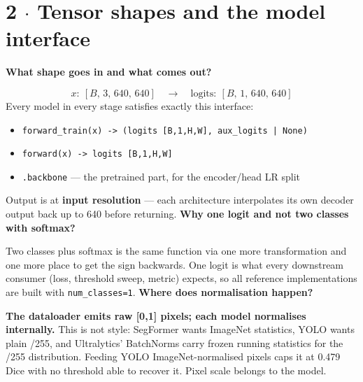 \documentclass[10pt,a4paper]{article}
\newcommand{\qq}[1]{\medskip\noindent\textbf{\color{navy}#1}\par\nobreak}
\begin{document}
\section*{2 $\cdot$ Tensor shapes and the model interface}
\qq{What shape goes in and what comes out?}
\[x:\ [B,\,3,\,640,\,640]\quad\longrightarrow\quad \mathrm{logits}:\ [B,\,1,\,640,\,640]\]
Every model in every stage satisfies exactly this interface:
\begin{itemize}\setlength\itemsep{1pt}
\item \texttt{forward_train(x) -> (logits [B,1,H,W], aux_logits | None)}
\item \texttt{forward(x) -> logits [B,1,H,W]}
\item \texttt{.backbone} — the pretrained part, for the encoder/head LR split
\end{itemize}
Output is at \textbf{input resolution} — each architecture interpolates its own decoder output back up to 640 before returning.
\qq{Why one logit and not two classes with softmax?}
Two classes plus softmax is the same function via one more transformation and one more place to get the sign backwards. One logit is what every downstream consumer (loss, threshold sweep, metric) expects, so all reference implementations are built with \texttt{num_classes=1}.
\qq{Where does normalisation happen?}
\textbf{The dataloader emits raw [0,1] pixels; each model normalises internally.} This is not style: SegFormer wants ImageNet statistics, YOLO wants plain /255, and Ultralytics' BatchNorms carry frozen running statistics for the /255 distribution. Feeding YOLO ImageNet-normalised pixels caps it at 0.479 Dice with no threshold able to recover it. Pixel scale belongs to the model.
\end{document}

